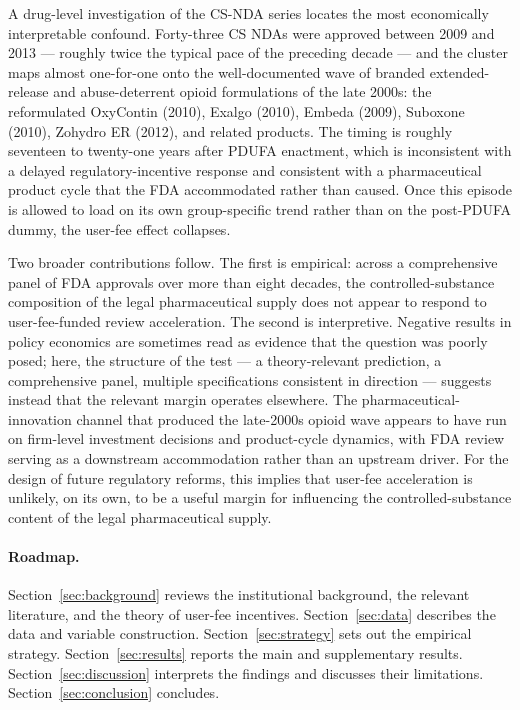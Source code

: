 A drug-level investigation of the CS-NDA series locates the most economically interpretable confound. Forty-three CS NDAs were approved between 2009 and 2013 --- roughly twice the typical pace of the preceding decade --- and the cluster maps almost one-for-one onto the well-documented wave of branded extended-release and abuse-deterrent opioid formulations of the late 2000s: the reformulated OxyContin (2010), Exalgo (2010), Embeda (2009), Suboxone (2010), Zohydro ER (2012), and related products. The timing is roughly seventeen to twenty-one years after PDUFA enactment, which is inconsistent with a delayed regulatory-incentive response and consistent with a pharmaceutical product cycle that the FDA accommodated rather than caused. Once this episode is allowed to load on its own group-specific trend rather than on the post-PDUFA dummy, the user-fee effect collapses.

Two broader contributions follow. The first is empirical: across a comprehensive panel of FDA approvals over more than eight decades, the controlled-substance composition of the legal pharmaceutical supply does not appear to respond to user-fee-funded review acceleration. The second is interpretive. Negative results in policy economics are sometimes read as evidence that the question was poorly posed; here, the structure of the test --- a theory-relevant prediction, a comprehensive panel, multiple specifications consistent in direction --- suggests instead that the relevant margin operates elsewhere. The pharmaceutical-innovation channel that produced the late-2000s opioid wave appears to have run on firm-level investment decisions and product-cycle dynamics, with FDA review serving as a downstream accommodation rather than an upstream driver. For the design of future regulatory reforms, this implies that user-fee acceleration is unlikely, on its own, to be a useful margin for influencing the controlled-substance content of the legal pharmaceutical supply.

\paragraph{Roadmap.} Section~\ref{sec:background} reviews the institutional background, the relevant literature, and the theory of user-fee incentives. Section~\ref{sec:data} describes the data and variable construction. Section~\ref{sec:strategy} sets out the empirical strategy. Section~\ref{sec:results} reports the main and supplementary results. Section~\ref{sec:discussion} interprets the findings and discusses their limitations. Section~\ref{sec:conclusion} concludes.
